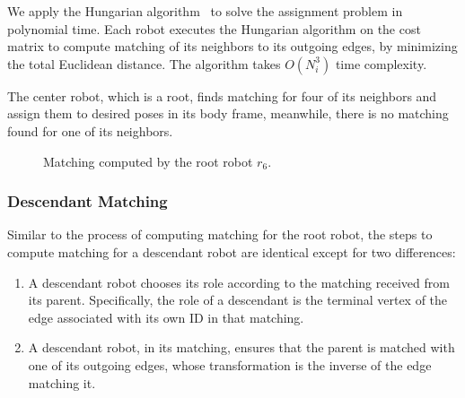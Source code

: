 We apply the Hungarian algorithm~\cite{Kuh55} to solve the assignment problem in polynomial time. 
%
Each robot executes the Hungarian algorithm on the cost matrix
to compute matching of its neighbors to its outgoing edges, by minimizing the total Euclidean distance. 
%
The algorithm takes $O(N_i^3)$ time complexity.

%
The center robot, which is a root, finds matching for four of its
neighbors and assign them to desired poses in its body frame, meanwhile, there
is no matching found for one of its neighbors.
\begin{figure}
    \centering
    \begin{minipage}{0.9\textwidth}
    \centering
    
    \end{minipage}
    \caption{Matching computed by the root robot $r_6$.}
    \label{fig:formsquare}
\end{figure}
\begin{figure}
    \centering
    
    \label{fig:formsquare-auth}
\end{figure}

\subsubsection{Descendant Matching}

Similar to the process of computing matching for the root robot, the steps to compute matching for a descendant robot are identical except for two differences:
\begin{enumerate}
\item A descendant robot chooses its role according to the matching received from its parent.  
%
    Specifically, the role of a descendant is the terminal vertex of
  the edge associated with its own ID in that matching. 
\item A descendant robot, in its matching, ensures that the parent is
  matched with one of its outgoing edges, whose transformation is the inverse of the edge matching it.
\end{enumerate}

